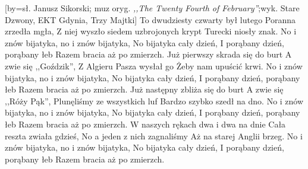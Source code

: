[by={sł. Janusz Sikorski; muz oryg. \textit{,,The Twenty Fourth of February''};\break wyk. Stare Dzwony, EKT Gdynia, Trzy Majtki}]
\calcchordswidth{\[C D e]}
\beginverse
\clist{\[G]}To dwudziesty czwarty był lutego
\clist{\[G D]}Poranna zrzedła mgła,
\clist{\[e G]}Z niej wyszło siedem uzbrojonych krypt
\clist{\[C D e]}Turecki niosły znak.
\endverse
\beginchorus\memorize[chorus]
\clist{\[G]}No i znów bijatyka, no i znów bijatyka,
\clist{\[G D]}No bijatyka cały dzień,
\clist{\[e G]}I porąbany dzień, porąbany łeb
\clist{\[C D e]}Razem bracia aż po zmierzch.
\endchorus
\beginverse
\clist{^}Już pierwszy skrada się do burt
\clist{^}A zwie się ,,Goździk'',
\clist{^}Z Algieru Pasza wysłał go
\clist{^}Żeby nam upuścić krwi.
\endverse
\ifphone
\beginchorus\replay[chorus]
\clist{^}No i znów bijatyka, no i znów bijatyka,
\clist{^}No bijatyka cały dzień,
\clist{^}I porąbany dzień, porąbany łeb
\clist{^}Razem bracia aż po zmierzch.
\endchorus
\fi
\beginverse
\clist{^}Już następny zbliża się do burt
\clist{^}A zwie się ,,Róży Pąk'',
\clist{^}Plunęliśmy ze wszystkich luf
\clist{^}Bardzo szybko szedł na dno.
\endverse
\ifphone
\beginchorus\replay[chorus]
\clist{^}No i znów bijatyka, no i znów bijatyka,
\clist{^}No bijatyka cały dzień,
\clist{^}I porąbany dzień, porąbany łeb
\clist{^}Razem bracia aż po zmierzch.
\endchorus
\fi
\beginverse
\clist{^}W naszych rękach dwa i dwa na dnie
\clist{^}Cała reszta zwiała gdzieś,
\clist{^}No a jeden z nich zagnaliśmy
\clist{^}Aż na starej Anglii brzeg.
\endverse
\ifphone
\beginchorus\replay[chorus]
\clist{^}No i znów bijatyka, no i znów bijatyka,
\clist{^}No bijatyka cały dzień,
\clist{^}I porąbany dzień, porąbany łeb
\clist{^}Razem bracia aż po zmierzch.
\endchorus
\fi
\endsong
